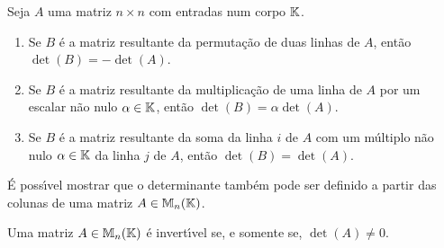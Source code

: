 \begin{proposicao}
	Seja $A$ uma matriz $n \times n$ com entradas num corpo $\mathbb{K}$.
	\begin{enumerate}[label={\roman*})]
		\item Se $B$ \'e a matriz resultante da permuta\c{c}\~ao de duas linhas de $A$, ent\~ao $\det (B) = -\det (A)$.
		\item Se $B$ \'e a matriz resultante da multiplica\c{c}\~ao de uma linha de $A$ por um escalar n\~ao nulo $\alpha \in \mathbb{K}$, ent\~ao $\det(B) = \alpha\det(A)$.
		\item Se $B$ \'e a matriz resultante da soma da linha $i$ de $A$ com um m\'ultiplo n\~ao nulo $\alpha \in \mathbb{K}$ da linha $j$ de $A$, ent\~ao $\det(B) = \det(A)$.
	\end{enumerate}
\end{proposicao}

\begin{observacao}
	\'E poss{\'\i}vel mostrar que o determinante tamb\'em pode ser definido a partir das colunas de uma matriz $A \in \mathbb{M}_n(\mathbb{K})$.
\end{observacao}

\begin{teorema}
	Uma matriz $A \in \mathbb{M}_n(\mathbb{K})$ \'e invert{\'\i}vel se, e somente se, $\det(A) \ne 0$.
\end{teorema}

